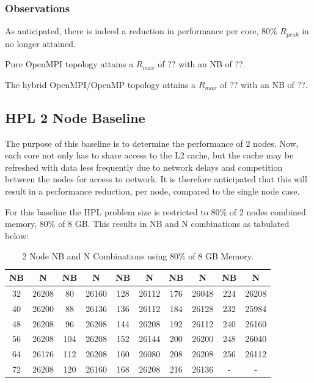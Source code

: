 \documentclass{report}
\begin{document}
%
%
\subsubsection{Observations}

As anticipated, there is indeed a reduction in performance per core, 80\% $R_{peak}$ in no longer attained.

Pure OpenMPI topology attains a $R_{max}$ of ?? with an NB of ??.

The hybrid OpenMPI/OpenMP topology attains a $R_{max}$ of ?? with an NB of ??.


%
%
\subsection{HPL 2 Node Baseline}

The purpose of this baseline is to determine the performance of 2 nodes. Now, each core not only has to share access to the L2 cache, but the cache may be refreshed with data less frequently due to network delays and competition between the nodes for access to network. It is therefore anticipated that this will result in a performance reduction, per node, compared to the single node case.

For this baseline the HPL problem size is restricted to 80\% of 2 nodes combined memory, 80\% of 8 GB. This results in NB and N combinations as tabulated below:

\begin{table}[H]
\begin{center}
	\begin{tabular}{ |c|c|c|c|c|c|c|c|c|c| } 
		\hline
		NB & N & NB & N & NB & N & NB & N & NB & N \\ 
		\hline
		32 & 26208 &  80 & 26160 & 128 & 26112 & 176 & 26048 & 224 & 26208 \\ 
		40 & 26200 &  88 & 26136 & 136 & 26112 & 184 & 26128 & 232 & 25984 \\ 
 		48 & 26208 &  96 & 26208 & 144 & 26208 & 192 & 26112 & 240 & 26160 \\
		56 & 26208 & 104 & 26208 & 152 & 26144 & 200 & 26200 & 248 & 26040 \\ 
 		64 & 26176 & 112 & 26208 & 160 & 26080 & 208 & 26208 & 256 & 26112 \\
		72 & 26208 & 120 & 26160 & 168 & 26208 & 216 & 26136 &   - &     - \\ 
 		\hline
	\end{tabular}
\end{center}
\caption{\label{tab:table-name}2 Node NB and N Combinations using 80\% of 8 GB Memory.}
\end{table}
\end{document}
